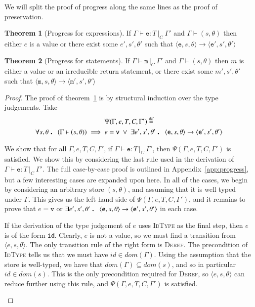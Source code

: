 \documentclass[12pt,a4paper,twoside,openright]{report}
\theoremstyle{definition}
\theoremstyle{dotless}
\newtheorem{theorem}{Theorem}[section]
\newcommand{\typable}[2][ ]{\Gamma{}\vdash\mathtt{#2}\, |_C#1\:\Gamma#1'}
\newcommand{\typed}[2]{\Gamma{}\vdash\mathtt{#1}: #2\,|_C\:\Gamma'}
\newcommand{\transition}[6]{\langle{}\mathtt{#1},#2,#3\rangle{}\rightarrow{}\langle{}\mathtt{#4},#5,#6\rangle}
\newcommand{\indHypTwo}{\Psi(\Gamma, e, T, C, \Gamma')}
\newcommand\eqdef{\mathrel{\overset{\makebox[0pt]{\mbox{\normalfont\tiny def}}}{=}}}
\newcommand\qdot{\mathbin{\scalebox{1.5}{.}}\enspace}
\begin{document}
We will split the proof of progress along the same lines as the proof of
preservation.

\begin{theorem}[Progress for expressions]\label{expProgress} If
  $\typed{e}{T}$ and $\Gamma \vdash (s, \theta)$ then either $e$ is a value or
  there exist some $e',s', \theta'$ such that
  $\transition{e}{s}{\theta}{e'}{s'}{\theta'}$ \end{theorem}
\begin{theorem}[Progress for statements]\label{mProgress}
  If $\typable{m}$ and $\Gamma \vdash (s, \theta)$ then $m$ is either a
  value or an irreducible return statement, or there exist some $m',s', \theta'$ such that
  $\transition{m}{s}{\theta}{m'}{s'}{\theta'}$ 
\end{theorem}

\begin{proof}
  The proof of theorem~\ref{expProgress} is by structural induction over the type judgements.
  Take
  \begin{multline*}
  	\indHypTwo \eqdef \\
  	\forall s,\theta\qdot (\Gamma \vdash (s,\theta))\implies e=\mathtt{v}\ \vee\ 
 	\exists e', s',\theta'\qdot \transition{e}{s}{\theta}{e'}{s'}{\theta'}
  \end{multline*}

  We show that for all $\Gamma, e, T, C, \Gamma'$, if $\typed{e}{T}$, then
  $\indHypTwo$ is satisfied. We show this by considering the last rule used in
  the derivation of $\typed{e}{T}$. The full case-by-case proof is outlined in
  Appendix~\ref{app:progress}, but a few interesting cases are expanded upon
  here. In all of the cases, we begin by considering an arbitrary store
  $(s,\theta)$, and assuming that it is well typed under $\Gamma$. This gives
  us the left hand side of $\indHypTwo$, and it remains to prove that
  $e=\mathtt{v}$ or $\exists e', s',\theta' \qdot
  \transition{e}{s}{\theta}{e'}{s'}{\theta'}$ in each case.

  \begin{case}[IdType]

	If the derivation of the type judgement of $e$ uses \textsc{IdType} as the
	final step, then $e$ is of the form \texttt{id}. Clearly, $e$ is not a
	value, so we must find a transition from $\langle e, s, \theta\rangle$. The
	only transition rule of the right form is \textsc{Deref}. The precondition
	of \textsc{IdType} tells us that we must have $id \in dom(\Gamma)$. Using
	the assumption that the store is well-typed, we have that
	$dom(\Gamma)\subseteq dom(s)$, and so in particular $id \in dom(s)$. This
	is the only precondition required for \textsc{Deref}, so $\langle e,
	s,\theta \rangle$ can reduce further using this rule, and $\indHypTwo$ is
	satisfied.
	

\end{case}
\end{proof}
\end{document}
